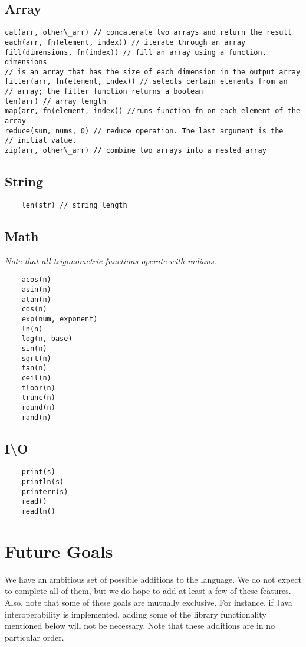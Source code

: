 \subsection{Array}
\begin{verbatim}
cat(arr, other\_arr) // concatenate two arrays and return the result
each(arr, fn(element, index)) // iterate through an array
fill(dimensions, fn(index)) // fill an array using a function. dimensions
// is an array that has the size of each dimension in the output array
filter(arr, fn(element, index)) // selects certain elements from an 
// array; the filter function returns a boolean
len(arr) // array length
map(arr, fn(element, index)) //runs function fn on each element of the array
reduce(sum, nums, 0) // reduce operation. The last argument is the 
// initial value.
zip(arr, other\_arr) // combine two arrays into a nested array
\end{verbatim}

\subsection{String}
\begin{verbatim}
    len(str) // string length
\end{verbatim}

\subsection{Math}
\emph{Note that all trigonometric functions operate with radians.}
\begin{verbatim}
    acos(n)
    asin(n)
    atan(n)
    cos(n)
    exp(num, exponent)
    ln(n)
    log(n, base)
    sin(n)
    sqrt(n)
    tan(n)
    ceil(n)
    floor(n)
    trunc(n)
    round(n)
    rand(n)
\end{verbatim}

\subsection{I\textbackslash O}
\begin{verbatim}
    print(s)
    println(s)
    printerr(s)
    read()
    readln()
\end{verbatim}

\section{Future Goals}
We have an ambitious set of possible additions to the language. We do not expect to complete all of them, but we do hope to add at least a few of these features. Also, note that some of these goals are mutually exclusive. For instance, if Java interoperability is implemented, adding some of the library functionality mentioned below will not be necessary. Note that these additions are in no particular order.

